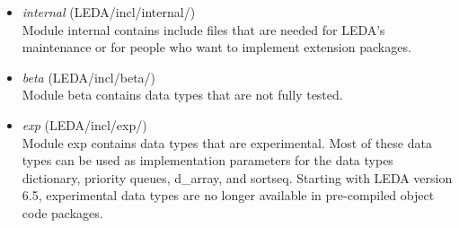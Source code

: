 \begin{itemize}
\item {\em internal} (LEDA/incl/internal/)\\
Module internal contains include files that are needed for LEDA's maintenance or for people who
want to implement extension packages.

\item {\em beta} (LEDA/incl/beta/)\\
Module beta contains data types that are not fully tested.

\item {\em exp} (LEDA/incl/exp/)\\
Module exp contains data types that are experimental. Most of these data types can be used
as implementation parameters for the data types dictionary, priority queues, d\_array, and
sortseq. Starting with LEDA version 6.5, experimental data types are no longer available
in pre-compiled object code packages.
\end{itemize}
